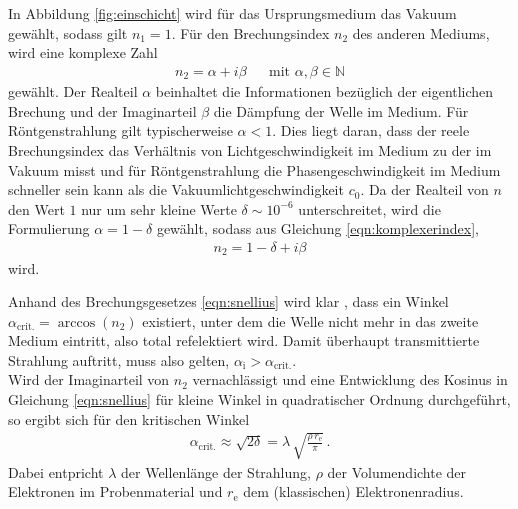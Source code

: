 In Abbildung \ref{fig:einschicht} wird für das Ursprungsmedium das Vakuum gewählt,
sodass gilt $n_{1} = 1$. Für den Brechungsindex $n_{2}$ des anderen Mediums,
wird eine komplexe Zahl
\begin{align}
  n_{2} = \alpha + i \beta& &\text{mit } \alpha, \beta \in \mathbb{N}
  \label{eqn:komplexerindex}
\end{align}
gewählt. Der Realteil $\alpha$ beinhaltet die Informationen bezüglich der
eigentlichen Brechung und der Imaginarteil $\beta$
die Dämpfung der Welle im Medium. Für Röntgenstrahlung gilt typischerweise
$\alpha < 1$. Dies liegt daran, dass der reele Brechungsindex das Verhältnis
von Lichtgeschwindigkeit im Medium zu der im Vakuum misst und für
Röntgenstrahlung die Phasengeschwindigkeit im Medium schneller
sein kann als die Vakuumlichtgeschwindigkeit $c_{0}$.
Da der Realteil von $n$ den Wert $1$ nur um sehr kleine Werte
$\delta \sim 10^{-6}$ unterschreitet, wird die Formulierung
$\alpha = 1 - \delta$ gewählt,
sodass aus Gleichung \eqref{eqn:komplexerindex},
\begin{align}
  n_{2} = 1 - \delta + i \beta
  \label{eqn:komplexerindexdelta}
\end{align}
wird.

Anhand des Brechungsgesetzes \eqref{eqn:snellius} wird klar , dass ein Winkel
$\alpha_\text{{crit.}} = \arccos\left( n_{2} \right)$ existiert,
unter dem die Welle nicht mehr in das zweite Medium eintritt,
also total refelektiert wird.
Damit überhaupt transmittierte Strahlung auftritt, muss also gelten,
$\alpha_{\text{i}} > \alpha_{\text{crit.}}$.\\
Wird der Imaginarteil von $n_{2}$ vernachlässigt und eine Entwicklung
des Kosinus in Gleichung \eqref{eqn:snellius} für kleine Winkel in
quadratischer Ordnung durchgeführt, so ergibt sich für den kritischen Winkel
\begin{align}
  \alpha_{\text{crit.}} \approx \sqrt{2 \delta} = \lambda \,
  \sqrt{\frac{ \rho \, r_{\text{e}} }{ \pi }} \, .
  \label{eqn:elektronendichte}
\end{align}
Dabei entpricht $\lambda$ der Wellenlänge der Strahlung, $\rho$ der
Volumendichte der Elektronen im Probenmaterial und $r_{\text{e}}$ dem
(klassischen) Elektronenradius.

